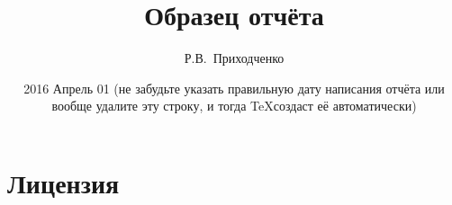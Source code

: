 
\author{Р.В.~Приходченко}

\title{Образец отчёта}

\date{2016 Апрель 01 (не забудьте указать правильную дату написания
  отчёта или вообще удалите эту строку, и тогда \TeX создаст её
  автоматически)}

\frenchspacing


\makeindex



\renewcommand\refname{\centering Список литературы}
\renewcommand\contentsname{\centering Содержание}

\maketitle

\tableofcontents







\section{Лицензия}



